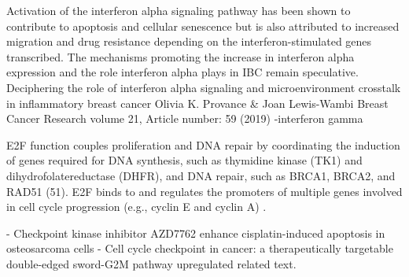 Activation of the interferon alpha signaling pathway has been shown to contribute to apoptosis and cellular senescence but is also attributed to increased migration and drug resistance depending on the interferon-stimulated genes transcribed. The mechanisms promoting the increase in interferon alpha expression and the role interferon alpha plays in IBC remain speculative. Deciphering the role of interferon alpha signaling and microenvironment crosstalk in inflammatory breast cancer
Olivia K. Provance & Joan Lewis-Wambi 
Breast Cancer Research volume 21, Article number: 59 (2019) 
\cite{provance2019deciphering}
\cite{mojic2018dark}-interferon gamma

E2F function couples proliferation and DNA repair by coordinating the induction of genes required for DNA synthesis, such as thymidine kinase (TK1) and dihydrofolatereductase (DHFR), and DNA repair, such as BRCA1, BRCA2, and RAD51 (51).
E2F binds to and regulates the promoters of multiple genes involved in cell cycle progression (e.g., cyclin E and cyclin A) \cite{wiedemeyer2014reversing, knudsen2010targeting}.

- Checkpoint kinase inhibitor AZD7762 enhance cisplatin-induced apoptosis in osteosarcoma cells
- Cell cycle checkpoint in cancer: a therapeutically targetable double-edged sword-G2M pathway upregulated related text.






 


